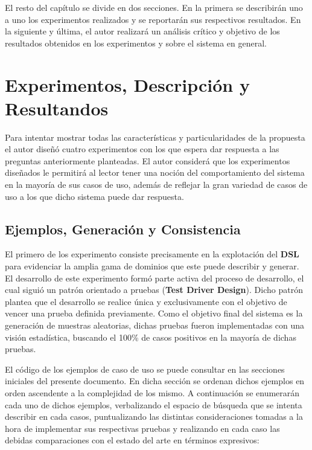 El resto del capítulo se divide en dos secciones. En la primera se describirán uno a uno los
experimentos realizados y se reportarán sus respectivos resultados. En la siguiente y última,
el autor realizará un análisis crítico y objetivo de los resultados obtenidos en los experimentos
y sobre el sistema en general.

\section*{Experimentos, Descripción y Resultandos}

Para intentar mostrar todas las características y particularidades de la propuesta el autor diseñó
cuatro experimentos con los que espera dar respuesta a las preguntas anteriormente planteadas. El
autor considerá que los experimentos diseñados le permitirá al lector tener una noción del
comportamiento del sistema en la mayoría de sus casos de uso, además de reflejar la gran variedad de
casos de uso a los que dicho sistema puede dar respuesta.

\subsection*{Ejemplos, Generación y Consistencia}

El primero de los experimento consiste precisamente en la explotación del {\bf DSL} para evidenciar la
amplia gama de dominios que este puede describir y generar. El desarrollo de este experimento
formó parte activa del proceso de desarrollo, el cual siguió un patrón orientado a pruebas ({\bf Test
            Driver Design}). Dicho patrón plantea que el desarrollo se realice única y exclusivamente con el
objetivo de vencer una prueba definida previamente. Como el objetivo final del sistema es la
generación de muestras aleatorias, dichas pruebas fueron implementadas con una visión estadística,
buscando el 100\% de casos positivos en la mayoría de dichas pruebas.

El código de los ejemplos de caso de uso se puede consultar en las secciones iniciales del presente
documento. En dicha sección se ordenan dichos ejemplos en orden ascendente a la complejidad de los
mismo. A continuación se enumerarán cada uno de dichos ejemplos, verbalizando el espacio de búsqueda
que se intenta describir en cada casos, puntualizando las distintas consideraciones tomadas a la hora
de implementar sus respectivas pruebas y realizando en cada caso las debidas comparaciones con el
estado del arte en términos expresivos:

